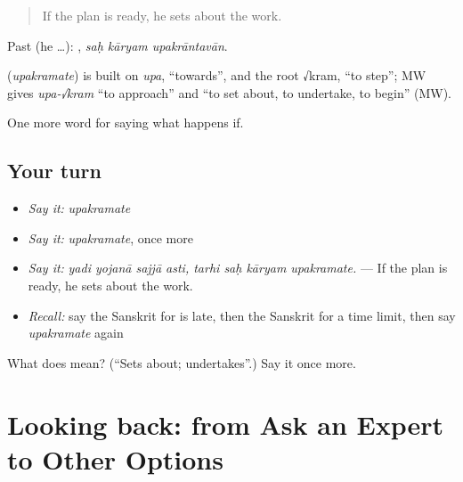 \begin{quote}
If the plan is ready, he sets about the work.
\end{quote}

Past (he …):   , \emph{saḥ kāryam upakrāntavān}.

\begin{cousinweb}
\textbf{} (\emph{upakramate}) is built on \emph{upa}, \textquotedblleft{}towards\textquotedblright{}, and the root √kram, \textquotedblleft{}to step\textquotedblright{}; MW gives \emph{upa-√kram} \textquotedblleft{}to approach\textquotedblright{} and \textquotedblleft{}to set about, to undertake, to begin\textquotedblright{} (MW).
\end{cousinweb}

\begin{grammarlens}[title={What you've built}]
One more word for saying what happens if.
\end{grammarlens}

\subsection*{Your turn}
\begin{itemize}
\raggedright
  \item \emph{Say it:} \emph{upakramate}
  \item \emph{Say it:} \emph{upakramate}, once more
  \item \emph{Say it:} \emph{yadi yojanā sajjā asti, tarhi saḥ kāryam upakramate.} — If the plan is ready, he sets about the work.
  \item \emph{Recall:} say the Sanskrit for is late, then the Sanskrit for a time limit, then say \emph{upakramate} again
\end{itemize}

\begin{tcolorbox}[breakable,colback=teal!4,colframe=teal!35!black,title={Before you move on}]
What does  mean? (\textquotedblleft{}Sets about; undertakes\textquotedblright{}.) Say it once more.
\end{tcolorbox}
\section[(dialogue)]{Looking back: from Ask an Expert to Other Options}

\label{lesson:SA-R371-review-364-371}



